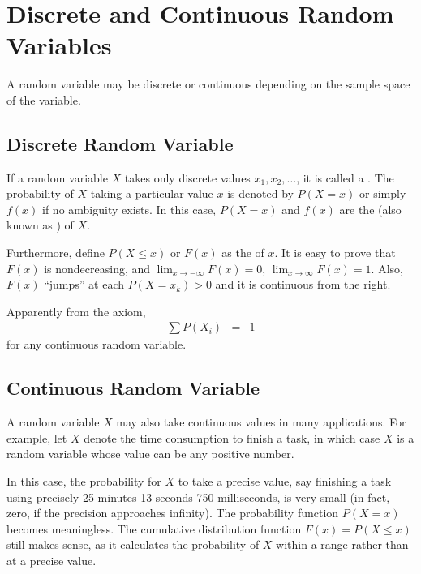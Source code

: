 \section{Discrete and Continuous Random Variables}

A random variable may be discrete or continuous depending on the sample space of the variable.

\subsection{Discrete Random Variable}

If a random variable $X$ takes only discrete values $x_1, x_2, \ldots$, it is called a .
The probability of $X$ taking a particular value $x$ is denoted by $P(X=x)$ or simply $f(x)$ if no ambiguity exists. In this case, $P(X=x)$ and $f(x)$ are the  (also known as ) of $X$.

Furthermore, define $P(X\leq x)$ or $F(x)$ as the  of $x$. It is easy to prove that $F(x)$ is nondecreasing, and $\lim_{x\rightarrow -\infty}F(x)=0$, $\lim_{x\rightarrow \infty}F(x)=1$. Also, $F(x)$ ``jumps'' at each $P(X=x_k)>0$ and it is continuous from the right.

Apparently from the axiom,
\begin{eqnarray}
	\sum P(X_i) &=& 1 \nonumber
\end{eqnarray}
for any continuous random variable.

\subsection{Continuous Random Variable}

A random variable $X$ may also take continuous values in many applications. For example, let $X$ denote the time consumption to finish a task, in which case $X$ is a random variable whose value can be any positive number.

In this case, the probability for $X$ to take a precise value, say finishing a task using precisely 25 minutes 13 seconds 750 milliseconds, is very small (in fact, zero, if the precision approaches infinity). The probability function $P(X=x)$ becomes meaningless. The cumulative distribution function $F(x) = P(X\leq x)$ still makes sense, as it calculates the probability of $X$ within a range rather than at a precise value.

